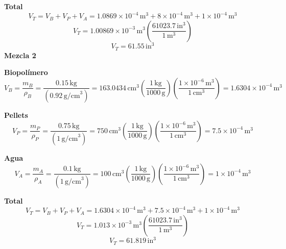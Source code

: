 \documentclass[14pt,oneside]{extarticle} %
\begin{document}
\textbf{Total}
\begin{equation*}
V_T = V_B + V_P + V_A = 1.0869\times10^{-4}\, \text{m}^3 + 8\times10^{-4}\, \text{m}^3 + 1\times10^{-4}\, \text{m}^3
\end{equation*}
\begin{equation*}
V_T = 1.00869\times10^{-3}\, \text{m}^3 \left( \frac{61023.7\, \text{in}^3}{1\, \text{m}^3} \right)
\end{equation*}
\begin{equation*}
V_T = 61.55\, \text{in}^3
\end{equation*}
\textbf{Mezcla 2}

\textbf{Biopolímero}
\begin{equation*}
V_B = \frac{m_B}{\rho_B} = \frac{0.15\, \text{kg}}{(0.92\, \text{g/cm}^3)} = 163.0434\, \text{cm}^3 \left( \frac{1\, \text{kg}}{1000\, \text{g}} \right) \left( \frac{1\times10^{-6}\, \text{m}^3}{1\, \text{cm}^3} \right) = 1.6304\times10^{-4}\, \text{m}^3
\end{equation*}

\textbf{Pellets}
\begin{equation*}
V_P = \frac{m_P}{\rho_P} = \frac{0.75\, \text{kg}}{(1\, \text{g/cm}^3)} = 750\, \text{cm}^3 \left( \frac{1\, \text{kg}}{1000\, \text{g}} \right) \left( \frac{1\times10^{-6}\, \text{m}^3}{1\, \text{cm}^3} \right) = 7.5\times10^{-4}\, \text{m}^3
\end{equation*}

\textbf{Agua}
\begin{equation*}
V_A = \frac{m_A}{\rho_A} = \frac{0.1\, \text{kg}}{(1\, \text{g/cm}^3)} = 100\, \text{cm}^3 \left( \frac{1\, \text{kg}}{1000\, \text{g}} \right) \left( \frac{1\times10^{-6}\, \text{m}^3}{1\, \text{cm}^3} \right) = 1\times10^{-4}\, \text{m}^3
\end{equation*}

\textbf{Total}
\begin{equation*}
V_T = V_B + V_P + V_A = 1.6304\times10^{-4}\, \text{m}^3 + 7.5\times10^{-4}\, \text{m}^3 + 1\times10^{-4}\, \text{m}^3
\end{equation*}
\begin{equation*}
V_T = 1.013\times10^{-3}\, \text{m}^3 \left( \frac{61023.7\, \text{in}^3}{1\, \text{m}^3} \right)
\end{equation*}
\begin{equation*}
V_T = 61.819\, \text{in}^3
\end{equation*}

\newpage
\end{document}
